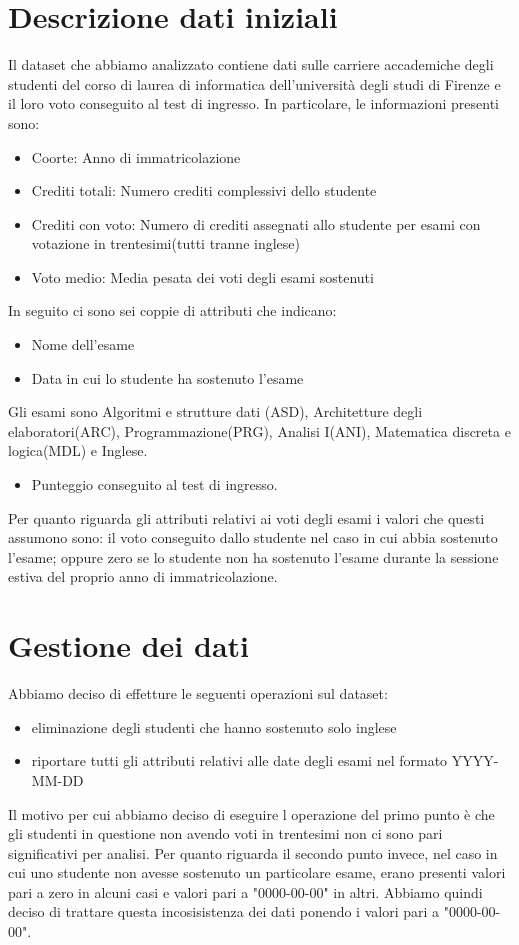 \documentclass[12pt]{article}
\begin{document}
\section{Descrizione dati iniziali}
Il dataset che abbiamo analizzato contiene dati sulle carriere accademiche degli studenti del corso di laurea di informatica dell'università degli studi di Firenze e il loro voto conseguito 
al test di ingresso. In particolare, le informazioni presenti sono:
\begin{itemize}
	\item Coorte: Anno di immatricolazione
	\item Crediti totali: Numero crediti complessivi dello studente
	\item Crediti con voto: Numero di crediti assegnati allo studente per esami con votazione in trentesimi(tutti tranne inglese)
	\item Voto medio: Media pesata dei voti degli esami sostenuti
\end{itemize}
In seguito ci sono sei coppie di attributi che indicano:
\begin{itemize}
	\item Nome dell'esame
	\item Data in cui lo studente ha sostenuto l'esame
\end{itemize}
Gli esami sono Algoritmi e strutture dati (ASD), Architetture degli elaboratori(ARC), Programmazione(PRG), Analisi I(ANI), Matematica discreta e logica(MDL) e Inglese.
\begin{itemize}
	\item Punteggio conseguito al test di ingresso.
\end{itemize}

Per quanto riguarda gli attributi relativi ai voti degli esami i valori che questi assumono sono:
il voto conseguito dallo studente nel caso in cui abbia sostenuto l'esame;
oppure zero se lo studente non ha sostenuto l'esame durante la sessione estiva del proprio anno di immatricolazione.

\section{Gestione dei dati}
Abbiamo deciso di effetture le seguenti operazioni sul dataset:
\begin{itemize}
	\item eliminazione degli studenti che hanno sostenuto solo inglese
	\item riportare tutti gli attributi relativi alle date degli esami nel formato YYYY-MM-DD
\end{itemize}
Il motivo per cui abbiamo deciso di eseguire l operazione del primo punto è che gli studenti in questione non avendo voti in trentesimi non ci sono pari significativi per analisi.
Per quanto riguarda il secondo punto invece, nel caso in cui uno studente non avesse sostenuto un particolare esame, erano presenti valori pari a zero in alcuni casi e valori pari a "0000-00-00" in altri.
Abbiamo quindi deciso di trattare questa incosisistenza dei dati ponendo i valori pari a "0000-00-00".
\end{document}
